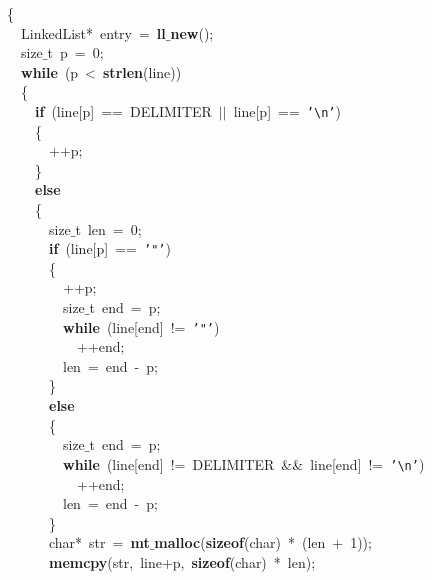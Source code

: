 \documentclass{article}
\begin{document}
\mbox{}\ \ \{ \\
\mbox{}\ \ \ \ LinkedList*\ entry\ =\ \textbf{ll$\_$new}(); \\
\mbox{}\ \ \ \ size$\_$t\ p\ =\ 0; \\
\mbox{}\ \ \ \ \textbf{while}\ (p\ \textless{}\ \textbf{strlen}(line)) \\
\mbox{}\ \ \ \ \{ \\
\mbox{}\ \ \ \ \ \ \textbf{if}\ (line[p]\ ==\ DELIMITER\ $|$$|$\ line[p]\ ==\ \texttt{'}\texttt{\textbackslash{}n}\texttt{'}) \\
\mbox{}\ \ \ \ \ \ \{ \\
\mbox{}\ \ \ \ \ \ \ \ ++p; \\
\mbox{}\ \ \ \ \ \ \} \\
\mbox{}\ \ \ \ \ \ \textbf{else} \\
\mbox{}\ \ \ \ \ \ \{ \\
\mbox{}\ \ \ \ \ \ \ \ size$\_$t\ len\ =\ 0; \\
\mbox{}\ \ \ \ \ \ \ \ \textbf{if}\ (line[p]\ ==\ \texttt{'"{}'}) \\
\mbox{}\ \ \ \ \ \ \ \ \{ \\
\mbox{}\ \ \ \ \ \ \ \ \ \ ++p; \\
\mbox{}\ \ \ \ \ \ \ \ \ \ size$\_$t\ end\ =\ p; \\
\mbox{}\ \ \ \ \ \ \ \ \ \ \textbf{while}\ (line[end]\ !=\ \texttt{'"{}'}) \\
\mbox{}\ \ \ \ \ \ \ \ \ \ \ \ ++end; \\
\mbox{}\ \ \ \ \ \ \ \ \ \ len\ =\ end\ -\ p; \\
\mbox{}\ \ \ \ \ \ \ \ \} \\
\mbox{}\ \ \ \ \ \ \ \ \textbf{else} \\
\mbox{}\ \ \ \ \ \ \ \ \{ \\
\mbox{}\ \ \ \ \ \ \ \ \ \ size$\_$t\ end\ =\ p; \\
\mbox{}\ \ \ \ \ \ \ \ \ \ \textbf{while}\ (line[end]\ !=\ DELIMITER\ \&\&\ line[end]\ !=\ \texttt{'}\texttt{\textbackslash{}n}\texttt{'}) \\
\mbox{}\ \ \ \ \ \ \ \ \ \ \ \ ++end; \\
\mbox{}\ \ \ \ \ \ \ \ \ \ len\ =\ end\ -\ p; \\
\mbox{}\ \ \ \ \ \ \ \ \} \\
\mbox{}\ \ \ \ \ \ \ \ char*\ str\ =\ \textbf{mt$\_$malloc}(\textbf{sizeof}(char)\ *\ (len\ +\ 1)); \\
\mbox{}\ \ \ \ \ \ \ \ \textbf{memcpy}(str,\ line+p,\ \textbf{sizeof}(char)\ *\ len); \\
$$
\end{document}
